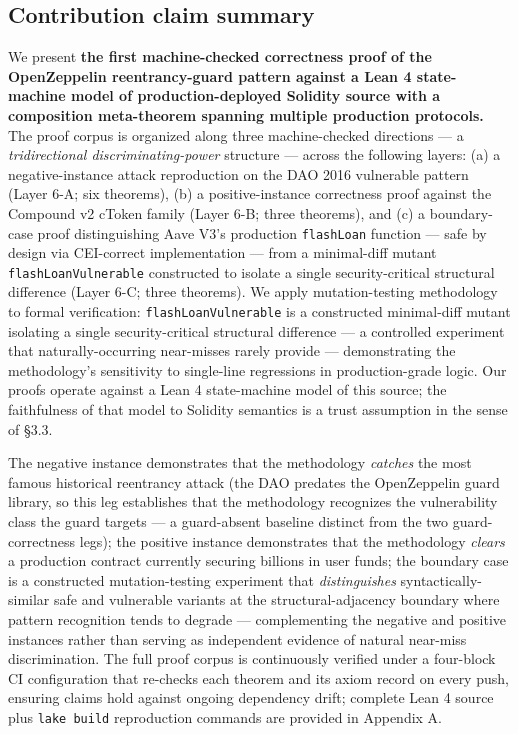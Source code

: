\subsection{Contribution claim
summary}\label{contribution-claim-summary}

We present \textbf{the first machine-checked correctness proof of the
OpenZeppelin reentrancy-guard pattern against a Lean 4 state-machine
model of production-deployed Solidity source with a composition
meta-theorem spanning multiple production protocols.} The proof corpus
is organized along three machine-checked directions --- a
\emph{tridirectional discriminating-power} structure --- across the
following layers: (a) a negative-instance attack reproduction on the DAO
2016 vulnerable pattern (Layer 6-A; six theorems), (b) a
positive-instance correctness proof against the Compound v2 cToken
family (Layer 6-B; three theorems), and (c) a boundary-case proof
distinguishing Aave V3's production \texttt{flashLoan} function --- safe
by design via CEI-correct implementation --- from a minimal-diff mutant
\texttt{flashLoanVulnerable} constructed to isolate a single
security-critical structural difference (Layer 6-C; three theorems). We
apply mutation-testing methodology to formal verification:
\texttt{flashLoanVulnerable} is a constructed minimal-diff mutant
isolating a single security-critical structural difference --- a
controlled experiment that naturally-occurring near-misses rarely
provide --- demonstrating the methodology's sensitivity to single-line
regressions in production-grade logic. Our proofs operate against a Lean
4 state-machine model of this source; the faithfulness of that model to
Solidity semantics is a trust assumption in the sense of §3.3.

The negative instance demonstrates that the methodology \emph{catches}
the most famous historical reentrancy attack (the DAO predates the
OpenZeppelin guard library, so this leg establishes that the methodology
recognizes the vulnerability class the guard targets --- a guard-absent
baseline distinct from the two guard-correctness legs); the positive
instance demonstrates that the methodology \emph{clears} a production
contract currently securing billions in user funds; the boundary case is
a constructed mutation-testing experiment that \emph{distinguishes}
syntactically-similar safe and vulnerable variants at the
structural-adjacency boundary where pattern recognition tends to degrade
--- complementing the negative and positive instances rather than
serving as independent evidence of natural near-miss discrimination. The
full proof corpus is continuously verified under a four-block CI
configuration that re-checks each theorem and its axiom record on every
push, ensuring claims hold against ongoing dependency drift; complete
Lean 4 source plus \texttt{lake\ build} reproduction commands are
provided in Appendix A.

